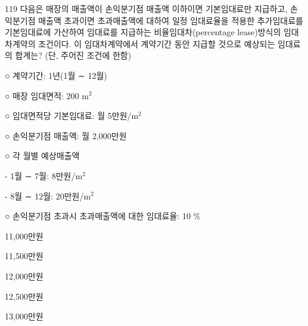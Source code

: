 \begin{question}{119}
다음은 매장의 매출액이 손익분기점 매출액 이하이면 기본임대료만 지급하고, 손익분기점 매출액 초과이면 초과매출액에 대하여 일정 임대료율을 적용한 추가임대료를 기본임대료에 가산하여 임대료를 지급하는 비율임대차(percentage lease)방식의 임대차계약의 조건이다. 이 임대차계약에서 계약기간 동안 지급할 것으로 예상되는 임대료의 합계는? (단, 주어진 조건에 한함)
\begin{framedtext}
○ 계약기간: 1년(1월 ∼ 12월) \par
○ 매장 임대면적: 200 $\mathrm{m}^{2}$ \par
○ 임대면적당 기본임대료: 월 5만원/$\mathrm{m}^{2}$ \par
○ 손익분기점 매출액: 월 2,000만원 \par
○ 각 월별 예상매출액 \par
\hspace*{1em}- 1월 ∼ 7월: 8만원/$\mathrm{m}^{2}$ \par
\hspace*{1em}- 8월 ∼ 12월: 20만원/$\mathrm{m}^{2}$ \par
○ 손익분기점 초과시 초과매출액에 대한 임대료율: 10 \% \par
\end{framedtext}
\begin{choices}
  \item 11,000만원
  \item 11,500만원
  \item 12,000만원
  \item 12,500만원
  \item 13,000만원
\end{choices}
\end{question}
